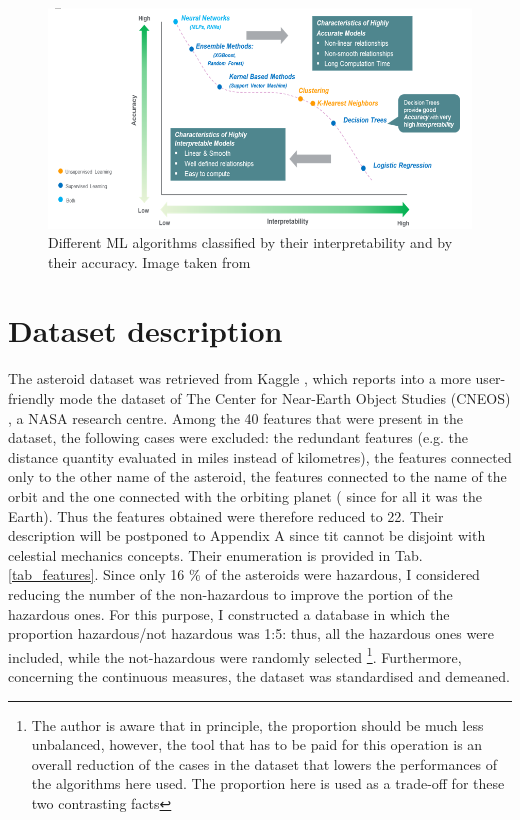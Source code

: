 \documentclass[12pt,%
               a4paper,%
               oneside,openany,%
               titlepage,%
               headinclude,footinclude,%
               BCOR5mm,%
               cleardoublepage=empty,%
               tablecaptionabove,%
               floatperchapter,
               ]{scrreprt}                 %
\begin{document}
\begin{figure}[h]
\begin{center}
\includegraphics[width=1\textwidth]{Figures/ML_intepretability.png}
\caption{Different ML algorithms classified by their interpretability and by their accuracy. Image taken from \cite{ml_interpretability}}
\label{ML_intepretability}
\end{center}
\end{figure}


\chapter{Dataset description}

The asteroid dataset was retrieved from Kaggle \cite{kaggle_dataset}, which reports into a more user-friendly mode the dataset of The Center for Near-Earth Object Studies (CNEOS) \cite{cneos+nasa}, a NASA research centre. Among the 40 features that were present in the dataset,  the following cases were excluded: the redundant features (e.g. the distance quantity evaluated in miles instead of kilometres), the features connected only to the other name of the asteroid, the features connected to the name of the orbit and the one connected with the orbiting planet ( since for all it was the Earth). Thus the features obtained were therefore reduced to 22. Their description will be postponed to Appendix A since tit cannot be disjoint with celestial mechanics concepts. Their enumeration is provided in Tab. \ref{tab_features}. Since only 16 \% of the asteroids were hazardous, I considered reducing the number of the non-hazardous to improve the portion of the hazardous ones. For this purpose, I constructed a database in which the proportion hazardous/not hazardous was 1:5: thus, all the hazardous ones were included, while the not-hazardous were randomly selected \footnote{The author is aware that in principle, the proportion should be much less unbalanced, however, the tool that has to be paid for this operation is an overall reduction of the cases in the dataset that lowers the performances of the algorithms here used. The proportion here is used as a trade-off for these two contrasting facts}. Furthermore, concerning the continuous measures, the dataset was standardised and demeaned. 
\end{document}
